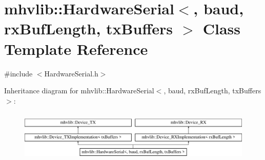 \hypertarget{classmhvlib_1_1_hardware_serial}{\section{mhvlib\-:\-:Hardware\-Serial$<$, baud, rx\-Buf\-Length, tx\-Buffers $>$ Class Template Reference}
\label{classmhvlib_1_1_hardware_serial}
}


{\ttfamily \#include $<$Hardware\-Serial.\-h$>$}

Inheritance diagram for mhvlib\-:\-:Hardware\-Serial$<$, baud, rx\-Buf\-Length, tx\-Buffers $>$\-:\begin{figure}[H]
\begin{center}
\leavevmode
\includegraphics[height=2.448980cm]{classmhvlib_1_1_hardware_serial}
\end{center}
\end{figure}
